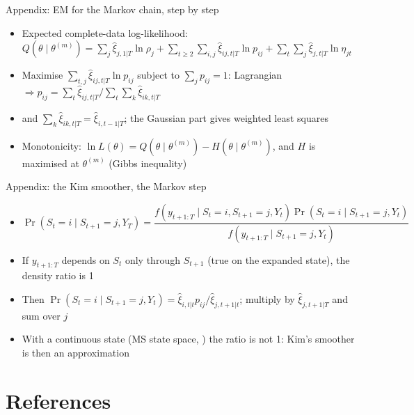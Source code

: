 \begin{frame}{Appendix: EM for the Markov chain, step by step}
\hypertarget{atsapp1}{}
\itemsize{\small}
\begin{itemize}
    \item Expected complete-data log-likelihood: $Q(\theta \mid \theta^{(m)}) = \sum_j\hat\xi_{j,1|T}\ln\rho_j + \sum_{t\ge2}\sum_{i,j}\hat\xi_{ij,t|T}\ln p_{ij} + \sum_t\sum_j\hat\xi_{j,t|T}\ln\eta_{jt}$
    \item Maximise $\sum_{t,j}\hat\xi_{ij,t|T}\ln p_{ij}$ subject to $\sum_j p_{ij} = 1$: Lagrangian $\Rightarrow p_{ij} = \sum_t\hat\xi_{ij,t|T}/\sum_t\sum_k\hat\xi_{ik,t|T}$
    \item and $\sum_k\hat\xi_{ik,t|T} = \hat\xi_{i,t-1|T}$; the Gaussian part gives weighted least squares
    \item Monotonicity: $\ln L(\theta) = Q(\theta \mid \theta^{(m)}) - H(\theta \mid \theta^{(m)})$, and $H$ is maximised at $\theta^{(m)}$ (Gibbs inequality) 
\end{itemize}
\end{frame}

\begin{frame}{Appendix: the Kim smoother, the Markov step}
\hypertarget{atsapp2}{}
\itemsize{\small}
\begin{itemize}
    \item $\Pr(S_t = i \mid S_{t+1} = j, Y_T) = \dfrac{f(y_{t+1:T} \mid S_t = i, S_{t+1} = j, Y_t)\Pr(S_t = i \mid S_{t+1} = j, Y_t)}{f(y_{t+1:T} \mid S_{t+1} = j, Y_t)}$
    \item If $y_{t+1:T}$ depends on $S_t$ only through $S_{t+1}$ (true on the expanded state), the density ratio is 1
    \item Then $\Pr(S_t = i \mid S_{t+1} = j, Y_t) = \hat\xi_{i,t|t}p_{ij}/\hat\xi_{j,t+1|t}$; multiply by $\hat\xi_{j,t+1|T}$ and sum over $j$
    \item With a continuous state (MS state space, ) the ratio is not 1: Kim's smoother is then an approximation
\end{itemize}
\end{frame}


\section{References}


